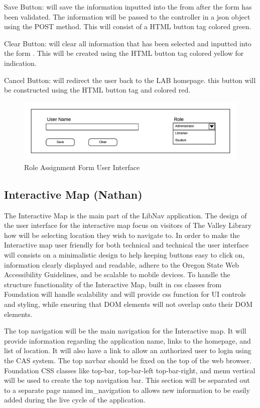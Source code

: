 \documentclass[letterpaper,10pt,titlepage, onecolumn, compsoc]{IEEEtran}
\begin{document}
Save Button: will save the information inputted into the from after the form has been validated. The information will be passed to the controller in a json object using the POST method. This will consist of a HTML button tag colored green. 

Clear Button: will clear all information that has been selected and inputted into the form . This will be created using the HTML button tag colored yellow for indication. 

Cancel Button: will redirect the user back to the LAB homepage. this button will be constructed using the HTML button tag and colored red.

\begin{figure}[h!]
\centering
\includegraphics[scale=.6\textwidth,natwidth=2250,natheight=615]{images/role-assignment-form.png}
\caption{Role Assignment Form User Interface}
\label{fig:method}
\end{figure}

\subsection{Interactive Map (Nathan)}
The Interactive Map is the main part of the LibNav application. The design of the user interface for the interactive map focus on visitors of The Valley Library how will be selecting location they wish to navigate to. In order to make the Interactive map user friendly for both technical and technical the user interface will consists on a minimalistic design to help keeping buttons easy to click on, information clearly displayed and readable, adhere to the Oregon State Web Accessibility Guidelines, and be scalable to mobile devices. To handle the structure functionality of the Interactive Map, built in css classes from Foundation will handle scalability and will provide css function for UI controls and styling, while ensuring that DOM elements will not overlap onto their DOM elements. 

The top navigation will be the main navigation for the Interactive map. It will provide information regarding the application name, links to the homepage, and list of location. It will also have a link to allow an authorized user to login using the CAS system. The top navbar should be fixed on the top of the web browser. Foundation CSS classes like top-bar, top-bar-left top-bar-right, and menu vertical will be used to create the top navigation bar. This section will be separated out to a separate page named im\_navigation to allows new information to be easily  added during the live cycle of the application. 
\end{document}
